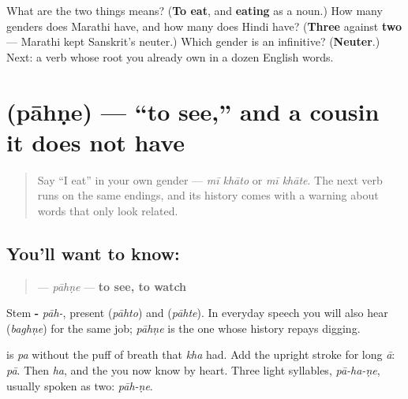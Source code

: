\begin{tcolorbox}[breakable,colback=teal!4,colframe=teal!35!black,title={Before you move on}]
What are the two things \textbf{} means? (\textbf{To eat}, and \textbf{eating} as a noun.) How many genders does Marathi have, and how many does Hindi have? (\textbf{Three} against \textbf{two} — Marathi kept Sanskrit's neuter.) Which gender is an infinitive? (\textbf{Neuter}.) Next: a verb whose root you already own in a dozen English words.
\end{tcolorbox}
\section[\texorpdfstring{\mr{पाहणे} (pāhṇe)}{पाहणे (pāhṇe)}]{ (pāhṇe) — \textquotedblleft{}to see,\textquotedblright{} and a cousin it does not have}

\label{lesson:MR-C07-pahne}



\begin{quote}
Say \textquotedblleft{}I eat\textquotedblright{} in your own gender — \emph{mī khāto} or \emph{mī khāte}. The next verb runs on the same endings, and its history comes with a warning about words that only look related.
\end{quote}

\subsection*{You'll want to know: }
\begin{quote}
\textbf{} — \emph{pāhṇe} — \textbf{to see, to watch}
\end{quote}

Stem \textbf{-} \emph{pāh-}, present \textbf{} (\emph{pāhto}) and \textbf{} (\emph{pāhte}). In everyday speech you will also hear \textbf{} (\emph{baghṇe}) for the same job; \emph{pāhṇe} is the one whose history repays digging.

\begin{sounds}
\textbf{} is \emph{pa} without the puff of breath that \emph{kha} had. Add the upright stroke for long \emph{ā}: \textbf{} \emph{pā}. Then \textbf{} \emph{ha}, and the \textbf{} you now know by heart. Three light syllables, \emph{pā-ha-ṇe}, usually spoken as two: \emph{pāh-ṇe}.
\end{sounds}

